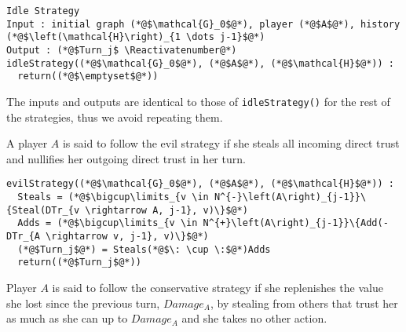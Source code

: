 \documentclass[11pt]{llncs}
\makeatletter
\newcommand*\Suppressnumber{%
  \lst@AddToHook{OnNewLine}{%
    \let\thelstnumber\relax%
     \advance\c@lstnumber-\@ne\relax%
    }%
}
\theoremstyle{definition}
\makeatother
\begin{document}
     \Suppressnumber
     \begin{lstlisting}[label=idlestrategy, style=numbers]
Idle Strategy
Input : initial graph (*@$\mathcal{G}_0$@*), player (*@$A$@*), history (*@$\left(\mathcal{H}\right)_{1 \dots j-1}$@*)
Output : (*@$Turn_j$ \Reactivatenumber@*)
idleStrategy((*@$\mathcal{G}_0$@*), (*@$A$@*), (*@$\mathcal{H}$@*)) :
  return((*@$\emptyset$@*))
     \end{lstlisting}
     The inputs and outputs are identical to those of \texttt{idleStrategy()} for the rest of the strategies, thus we avoid
     repeating them.
     \begin{definition}
        A player $A$ is said to follow the evil strategy if she steals all incoming direct trust and nullifies her outgoing
        direct trust in her turn.
     \end{definition}

     \begin{lstlisting}[label=evilstrategy, style=numbers]
evilStrategy((*@$\mathcal{G}_0$@*), (*@$A$@*), (*@$\mathcal{H}$@*)) :
  Steals = (*@$\bigcup\limits_{v \in N^{-}\left(A\right)_{j-1}}\{Steal(DTr_{v \rightarrow A, j-1}, v)\}$@*)
  Adds = (*@$\bigcup\limits_{v \in N^{+}\left(A\right)_{j-1}}\{Add(-DTr_{A \rightarrow v, j-1}, v)\}$@*)
  (*@$Turn_j$@*) = Steals(*@$\: \cup \:$@*)Adds
  return((*@$Turn_j$@*))
     \end{lstlisting}

     \begin{definition}
        Player $A$ is said to follow the conservative strategy if she replenishes the value she lost since the previous turn,
        $Damage_A$, by stealing from others that trust her as much as she can up to $Damage_A$ and she takes no other action.
     \end{definition}
\end{document}
